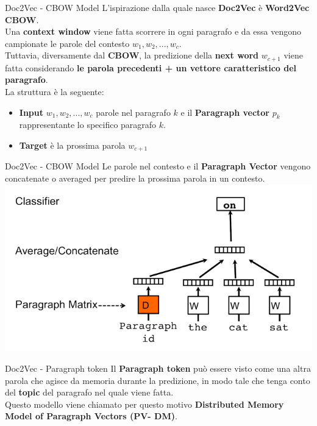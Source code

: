 \documentclass[british]{beamer}
\begin{document}
\begin{frame}{Doc2Vec - CBOW Model}
	L'ispirazione dalla quale nasce \textbf{Doc2Vec} \`{e} \textbf{Word2Vec CBOW}. \\
	Una \textbf{context window} viene fatta scorrere in ogni paragrafo e da essa vengono campionate le parole del contesto $w_{1}, w_{2}, ...,w_{c}$.\\
	Tuttavia, diversamente dal \textbf{CBOW}, la predizione della \textbf{next word} $w_{c+1}$ viene fatta considerando \textbf{le parola precedenti + un vettore caratteristico del paragrafo}.\\
	La struttura \`{e} la seguente:
	\begin{itemize}
		\item \textbf{Input} $w_{1}, w_{2}, ...,w_{c}$ parole nel paragrafo $k$ e il \textbf{Paragraph vector} $p_k $ rappresentante lo specifico paragrafo $k$.
		\item \textbf{Target} \`{e} la prossima parola $w_{c+1}$
	\end{itemize}
\end{frame}

\begin{frame}{Doc2Vec - CBOW Model}
	Le parole nel contesto e il \textbf{Paragraph Vector} vengono concatenate o averaged per predire la prossima parola in un contesto.\\
	\includegraphics[width= 1.01\linewidth]{./Imgs/d2v-cbow.png}
\end{frame}

\begin{frame}{Doc2Vec - Paragraph token}
	Il \textbf{Paragraph token} pu\`{o} essere visto come una altra parola che agisce da memoria durante la predizione, in modo tale che tenga conto del \textbf{topic} del paragrafo nel quale viene fatta.\\
	Questo modello viene chiamato per questo motivo \textbf{Distributed Memory Model of Paragraph Vectors (PV- DM)}.
\end{frame}
\end{document}
